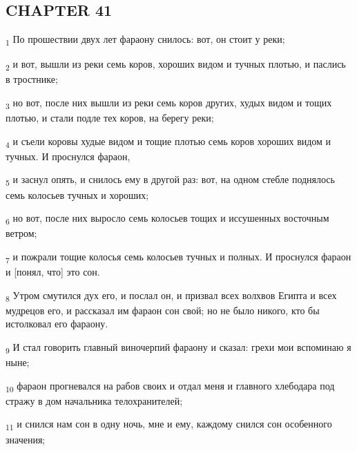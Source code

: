 \subsection{CHAPTER 41}
\begin{tcolorbox}
\textsubscript{1} По прошествии двух лет фараону снилось: вот, он стоит у реки;
\end{tcolorbox}
\begin{tcolorbox}
\textsubscript{2} и вот, вышли из реки семь коров, хороших видом и тучных плотью, и паслись в тростнике;
\end{tcolorbox}
\begin{tcolorbox}
\textsubscript{3} но вот, после них вышли из реки семь коров других, худых видом и тощих плотью, и стали подле тех коров, на берегу реки;
\end{tcolorbox}
\begin{tcolorbox}
\textsubscript{4} и съели коровы худые видом и тощие плотью семь коров хороших видом и тучных. И проснулся фараон,
\end{tcolorbox}
\begin{tcolorbox}
\textsubscript{5} и заснул опять, и снилось ему в другой раз: вот, на одном стебле поднялось семь колосьев тучных и хороших;
\end{tcolorbox}
\begin{tcolorbox}
\textsubscript{6} но вот, после них выросло семь колосьев тощих и иссушенных восточным ветром;
\end{tcolorbox}
\begin{tcolorbox}
\textsubscript{7} и пожрали тощие колосья семь колосьев тучных и полных. И проснулся фараон и [понял, что] это сон.
\end{tcolorbox}
\begin{tcolorbox}
\textsubscript{8} Утром смутился дух его, и послал он, и призвал всех волхвов Египта и всех мудрецов его, и рассказал им фараон сон свой; но не было никого, кто бы истолковал его фараону.
\end{tcolorbox}
\begin{tcolorbox}
\textsubscript{9} И стал говорить главный виночерпий фараону и сказал: грехи мои вспоминаю я ныне;
\end{tcolorbox}
\begin{tcolorbox}
\textsubscript{10} фараон прогневался на рабов своих и отдал меня и главного хлебодара под стражу в дом начальника телохранителей;
\end{tcolorbox}
\begin{tcolorbox}
\textsubscript{11} и снился нам сон в одну ночь, мне и ему, каждому снился сон особенного значения;
\end{tcolorbox}
